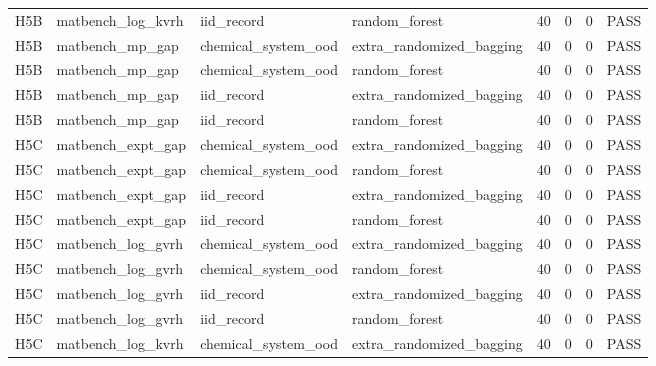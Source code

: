 \documentclass[10pt]{article}
\begin{document}
\begin{landscape}
\begin{longtable}{L{.32in}L{1.05in}L{1.2in}L{1.3in}L{.42in}L{.42in}L{.42in}L{.48in}}
H5B & matbench\_\allowbreak{}log\_\allowbreak{}kvrh & iid\_\allowbreak{}record & random\_\allowbreak{}forest & 40 & 0 & 0 & PASS\\
H5B & matbench\_\allowbreak{}mp\_\allowbreak{}gap & chemical\_\allowbreak{}system\_\allowbreak{}ood & extra\_\allowbreak{}randomized\_\allowbreak{}bagging & 40 & 0 & 0 & PASS\\
H5B & matbench\_\allowbreak{}mp\_\allowbreak{}gap & chemical\_\allowbreak{}system\_\allowbreak{}ood & random\_\allowbreak{}forest & 40 & 0 & 0 & PASS\\
H5B & matbench\_\allowbreak{}mp\_\allowbreak{}gap & iid\_\allowbreak{}record & extra\_\allowbreak{}randomized\_\allowbreak{}bagging & 40 & 0 & 0 & PASS\\
H5B & matbench\_\allowbreak{}mp\_\allowbreak{}gap & iid\_\allowbreak{}record & random\_\allowbreak{}forest & 40 & 0 & 0 & PASS\\
H5C & matbench\_\allowbreak{}expt\_\allowbreak{}gap & chemical\_\allowbreak{}system\_\allowbreak{}ood & extra\_\allowbreak{}randomized\_\allowbreak{}bagging & 40 & 0 & 0 & PASS\\
H5C & matbench\_\allowbreak{}expt\_\allowbreak{}gap & chemical\_\allowbreak{}system\_\allowbreak{}ood & random\_\allowbreak{}forest & 40 & 0 & 0 & PASS\\
H5C & matbench\_\allowbreak{}expt\_\allowbreak{}gap & iid\_\allowbreak{}record & extra\_\allowbreak{}randomized\_\allowbreak{}bagging & 40 & 0 & 0 & PASS\\
H5C & matbench\_\allowbreak{}expt\_\allowbreak{}gap & iid\_\allowbreak{}record & random\_\allowbreak{}forest & 40 & 0 & 0 & PASS\\
H5C & matbench\_\allowbreak{}log\_\allowbreak{}gvrh & chemical\_\allowbreak{}system\_\allowbreak{}ood & extra\_\allowbreak{}randomized\_\allowbreak{}bagging & 40 & 0 & 0 & PASS\\
H5C & matbench\_\allowbreak{}log\_\allowbreak{}gvrh & chemical\_\allowbreak{}system\_\allowbreak{}ood & random\_\allowbreak{}forest & 40 & 0 & 0 & PASS\\
H5C & matbench\_\allowbreak{}log\_\allowbreak{}gvrh & iid\_\allowbreak{}record & extra\_\allowbreak{}randomized\_\allowbreak{}bagging & 40 & 0 & 0 & PASS\\
H5C & matbench\_\allowbreak{}log\_\allowbreak{}gvrh & iid\_\allowbreak{}record & random\_\allowbreak{}forest & 40 & 0 & 0 & PASS\\
H5C & matbench\_\allowbreak{}log\_\allowbreak{}kvrh & chemical\_\allowbreak{}system\_\allowbreak{}ood & extra\_\allowbreak{}randomized\_\allowbreak{}bagging & 40 & 0 & 0 & PASS\\

\end{longtable}
\end{landscape}
\end{document}
